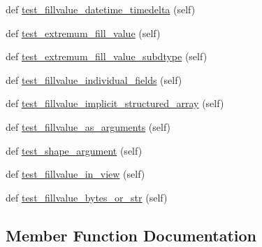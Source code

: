 \begin{DoxyCompactItemize}
\item 
def \hyperlink{classnumpy_1_1ma_1_1tests_1_1test__core_1_1TestFillingValues_a2586da0c284bd502d1001d6e0b0464b4}{test\+\_\+fillvalue\+\_\+datetime\+\_\+timedelta} (self)
\item 
def \hyperlink{classnumpy_1_1ma_1_1tests_1_1test__core_1_1TestFillingValues_a3719ba02dadd05087d042775c1365c41}{test\+\_\+extremum\+\_\+fill\+\_\+value} (self)
\item 
def \hyperlink{classnumpy_1_1ma_1_1tests_1_1test__core_1_1TestFillingValues_adb6485e713dcf2cf9758f95688858e99}{test\+\_\+extremum\+\_\+fill\+\_\+value\+\_\+subdtype} (self)
\item 
def \hyperlink{classnumpy_1_1ma_1_1tests_1_1test__core_1_1TestFillingValues_ac9addd6e879497bab90060bf4e626f6a}{test\+\_\+fillvalue\+\_\+individual\+\_\+fields} (self)
\item 
def \hyperlink{classnumpy_1_1ma_1_1tests_1_1test__core_1_1TestFillingValues_a1b4272aaaabd9ddd772dd82b17267666}{test\+\_\+fillvalue\+\_\+implicit\+\_\+structured\+\_\+array} (self)
\item 
def \hyperlink{classnumpy_1_1ma_1_1tests_1_1test__core_1_1TestFillingValues_a9bc3cf7d1c028a89d28a4daaed635711}{test\+\_\+fillvalue\+\_\+as\+\_\+arguments} (self)
\item 
def \hyperlink{classnumpy_1_1ma_1_1tests_1_1test__core_1_1TestFillingValues_ae214971681f18038779883a71a662fd4}{test\+\_\+shape\+\_\+argument} (self)
\item 
def \hyperlink{classnumpy_1_1ma_1_1tests_1_1test__core_1_1TestFillingValues_a82677ff585fe049b27afc9fd855e401e}{test\+\_\+fillvalue\+\_\+in\+\_\+view} (self)
\item 
def \hyperlink{classnumpy_1_1ma_1_1tests_1_1test__core_1_1TestFillingValues_aeaf6a1a81e699e9c6858b99ab2f53631}{test\+\_\+fillvalue\+\_\+bytes\+\_\+or\+\_\+str} (self)
\end{DoxyCompactItemize}


\subsection{Member Function Documentation}
\mbox{\label{classnumpy_1_1ma_1_1tests_1_1test__core_1_1TestFillingValues_a08814ee119332d1644174cf9cb132f71}} 
